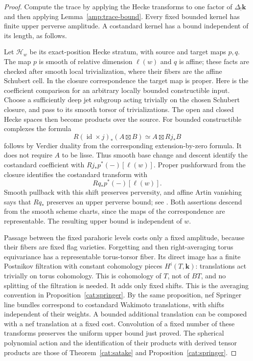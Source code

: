 \begin{proof}
Compute the trace by applying the Hecke transforms to one factor
of $\Delta_!\mathbf k$ and then applying
Lemma~\ref{amp:trace-bound}.  Every fixed bounded kernel has finite
upper perverse amplitude.  A costandard kernel has a bound
independent of its length, as follows.

Let $\mathcal H_w$ be its exact-position Hecke stratum, with source
and target maps $p,q$.  The map $p$ is smooth of relative dimension
$\ell(w)$ and $q$ is affine; these facts are checked after smooth
local trivialization, where their fibers are the affine Schubert
cell.  In the closure correspondence the target map is proper.
Here is the coefficient comparison for an arbitrary locally bounded
constructible input.  Choose a sufficiently deep jet subgroup acting
trivially on the chosen Schubert closure, and pass to its smooth
torsor of trivializations.  The open and closed Hecke spaces then
become products over the source.  For bounded constructible
complexes the formula
\[
 R(\operatorname{id}\times j)_*(A\boxtimes B)
 \simeq A\boxtimes Rj_*B
\]
follows by Verdier duality from the corresponding extension-by-zero
formula.  It does not require $A$ to be lisse.  Thus smooth base
change \cite[\S\,12.1]{LaszloOlssonSixII} and descent identify
the costandard coefficient with
$Rj_*p^*(-)[\ell(w)]$.  Proper pushforward from the closure
identifies the costandard transform with
\[
 Rq_*p^*(-)[\ell(w)].
\]
Smooth pullback with this shift preserves perversity, and affine
Artin vanishing says that $Rq_*$ preserves an upper perverse bound;
see \cite[\S\,3.2, paragraph preceding Theorem~3.2]{BeilinsonPerverse}.
Both assertions descend from the smooth scheme charts, since the
maps of the correspondence are representable.  The resulting upper
bound is independent of $w$.

Passage between the fixed parahoric levels costs only a fixed
amplitude, because their fibers are fixed flag varieties.
Forgetting and then right-averaging torus equivariance has a
representable torus-torsor fiber.  Its direct image has a finite
Postnikov filtration with constant cohomology pieces $H^i(T,\mathbf k)$:
translations act trivially on torus cohomology.  This is cohomology
of $T$, not of $BT$, and no splitting of the filtration is needed.
It adds only fixed shifts.  This is the averaging convention in
Proposition~\ref{cat:springer}.
By the same proposition, nef Springer line bundles correspond to
costandard Wakimoto translations, with shifts independent of their
weights.  A bounded additional translation can be composed with a
nef translation at a fixed cost.  Convolution of a fixed number of
these transforms preserves the uniform upper bound just proved.
The spherical polynomial action and the identification of their
products with derived tensor products are those of
Theorem~\ref{cat:satake} and Proposition~\ref{cat:springer}.
\end{proof}

